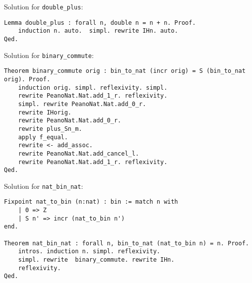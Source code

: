 Solution for \lstinline{double_plus}:
\begin{lstlisting}
Lemma double_plus : forall n, double n = n + n. Proof.
	induction n. auto.  simpl. rewrite IHn. auto.
Qed.
\end{lstlisting}

Solution for \lstinline{binary_commute}:
\begin{lstlisting}
Theorem binary_commute orig : bin_to_nat (incr orig) = S (bin_to_nat orig). Proof.
	induction orig. simpl. reflexivity. simpl.
	rewrite PeanoNat.Nat.add_1_r. reflexivity.
	simpl. rewrite PeanoNat.Nat.add_0_r.
	rewrite IHorig.
	rewrite PeanoNat.Nat.add_0_r.
	rewrite plus_Sn_m.
	apply f_equal.
	rewrite <- add_assoc.
	rewrite PeanoNat.Nat.add_cancel_l.
	rewrite PeanoNat.Nat.add_1_r. reflexivity.
Qed.
\end{lstlisting}

Solution for \lstinline{nat_bin_nat}:
\begin{lstlisting}
Fixpoint nat_to_bin (n:nat) : bin := match n with
	| 0 => Z
	| S n' => incr (nat_to_bin n')
end.

Theorem nat_bin_nat : forall n, bin_to_nat (nat_to_bin n) = n. Proof. 
	intros. induction n. simpl. reflexivity.
	simpl. rewrite  binary_commute. rewrite IHn.
	reflexivity. 
Qed.
\end{lstlisting}